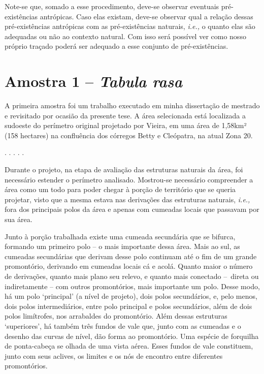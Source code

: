 \documentclass[12pt, a4paper]{book} %
\begin{document}
        Note-se que, somado a esse procedimento, deve-se observar eventuais pré-existências antrópicas. Caso elas existam, deve-se observar qual a relação dessas pré-existências antrópicas com as pré-existências naturais, \textit{i.e.,} o quanto elas são adequadas ou não ao contexto natural. Com isso será possível ver como nosso próprio traçado poderá ser adequado a esse conjunto de pré-existências.

            \section{Amostra 1 – \textit{Tabula rasa}}
        A primeira amostra foi um trabalho executado em minha dissertação de mestrado e revisitado por ocasião da presente tese. A área selecionada está localizada a sudoeste do perímetro original projetado por Vieira, em uma área de 1,58km² (158 hectares) na confluência dos córregos Betty e Cleópatra, na atual Zona 20. 
        
        \begin{center}
            . . . . .
        \end{center}  
        Durante o projeto, na etapa de avaliação das estruturas naturais da área, foi necessário estender o perímetro analisado. Mostrou-se necessário compreender a área como um todo para poder chegar à porção de território que se queria projetar, visto que a mesma estava nas derivações das estruturas naturais, \textit{i.e.,} fora dos principais polos da área e apenas com cumeadas locais que passavam por sua área.

        Junto à porção trabalhada existe uma cumeada secundária que se bifurca, formando um primeiro polo – o mais importante dessa área. Mais ao sul, as cumeadas secundárias que derivam desse polo continuam até o fim de um grande promontório, derivando em cumeadas locais cá e acolá. Quanto maior o número de derivações, quanto mais plano seu relevo, e quanto mais conectado – direta ou indiretamente – com outros promontórios, mais importante um polo. Desse modo, há um polo `principal' (a nível de projeto), dois polos secundários, e, pelo menos, dois polos intermediários, entre polo principal e polos secundários, além de dois polos limítrofes, nos arrabaldes do promontório.
        Além dessas estruturas `superiores', há também três fundos de vale que, junto com as cumeadas e o desenho das curvas de nível, dão forma ao promontório. Uma espécie de forquilha de ponta-cabeça se olhada de uma vista aérea. Esses fundos de vale constituem, junto com seus aclives, os limites e os nós de encontro entre diferentes promontórios. 
\end{document}
